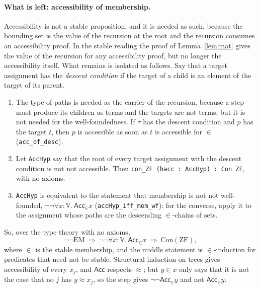 \documentclass[10pt]{article}
\theoremstyle{definition}
\theoremstyle{remark}
\newcommand{\ZF}{\mathrm{ZF}}
\newcommand{\EM}{\mathrm{EM}}
\newcommand{\Con}{\mathrm{Con}}
\newcommand{\Acc}{\mathsf{Acc}}
\newcommand{\V}{\mathbb{V}}
\newcommand{\lean}[1]{\texttt{#1}}
\begin{document}
\paragraph{What is left: accessibility of membership.}
Accessibility is not a stable proposition, and it is needed as such,
because the bounding set is the value of the recursion at the root and
the recursion consumes an accessibility proof. In the stable reading
the proof of Lemma~\ref{lem:mat} gives the value of the recursion for
any accessibility proof, but no longer the accessibility itself. What
remains is isolated as follows. Say that a target assignment has the
\emph{descent condition} if the target of a child is an element of the
target of its parent.
\begin{enumerate}
\item The type of paths is needed as the carrier of the recursion,
  because a step must produce its children as terms and the targets are
  not terms; but it is not needed for the well-foundedness. If $\tau$ has
  the descent condition and $p$ has the target $t$, then $p$ is accessible
  as soon as $t$ is accessible for $\in$ (\lean{acc\_of\_desc}).
\item Let \lean{AccHyp} say that the root of every target assignment with
  the descent condition is not not accessible. Then
  \lean{con\_ZF (hacc :\ AccHyp) :\ Con ZF}, with no axioms.
\item \lean{AccHyp} is equivalent to the statement that membership is not
  not well-founded, $\neg\neg\forall x{:}\V.\ \Acc_\in x$ (\lean{accHyp\_iff\_mem\_wf}):
  for the converse, apply it to the assignment whose paths are the
  descending $\in$-chains of sets.
\end{enumerate}
So, over the type theory with no axioms,
\[\neg\neg\EM\ \Longrightarrow\ \neg\neg\forall x{:}\V.\ \Acc_\in x\ \Longrightarrow\ \Con(\ZF),\]
where $\in$ is the stable membership, and the middle statement is
$\in$-induction for predicates that need not be stable. Structural
induction on trees gives accessibility of every $x_j$, and $\Acc$ respects
$\approx$; but $y\in x$ only says that it is not the case that no $j$ has
$y\approx x_j$, so the step gives $\neg\neg\Acc_\in y$ and not $\Acc_\in y$.
\end{document}
